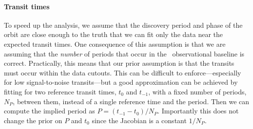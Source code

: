\documentclass[modern]{aastex62}
\begin{document}
\paragraph{Transit times}
To speed up the analysis, we assume that the discovery period and phase of the orbit are close enough to the truth that we can fit only the data near the expected transit times.
One consequence of this assumption is that we are assuming that the \emph{number} of periods that occur in the \tess\ observational baseline is correct.
Practically, this means that our prior assumption is that the transits must occur within the data cutouts.
This can be difficult to enforce---especially for low signal-to-noise transits---but a good approximation can be achieved by fitting for two reference transit times, $t_0$ and $t_{-1}$, with a fixed number of periods, $N_P$, between them, instead of a single reference time and the period.
Then we can compute the implied period as $P = (t_{-1} - t_0) / N_P$.
Importantly this does not change the prior on $P$ and $t_0$ since the Jacobian is a constant $1/N_P$.
\end{document}
